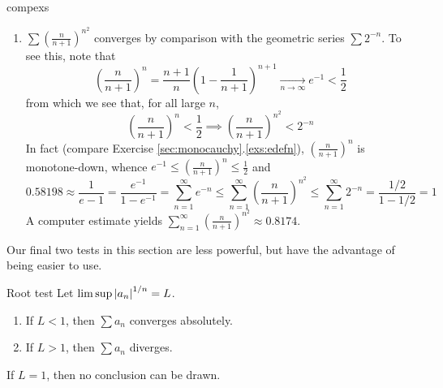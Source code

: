 \begin{examples}{}{compexs}
\begin{enumerate}
	  
	
	
	
	
		\item\label{ex:root5} $\sum\left(\frac n{n+1}\right)^{n^2}$ converges by comparison with the geometric series $\sum 2^{-n}$. To see this, note that
		\[\left(\frac n{n+1}\right)^n=\frac{n+1}n\left(1-\frac 1{n+1}\right)^{n+1}\xrightarrow[n\to\infty]{}e^{-1}<\frac 12\]
		from which we see that, for all large $n$,
		\[\left(\frac n{n+1}\right)^n<\frac 12\implies \left(\frac n{n+1}\right)^{n^2}< 2^{-n}\]
		In fact (compare Exercise \ref*{sec:monocauchy}.\ref{exs:edefn}), $\left(\frac n{n+1}\right)^n$ is monotone-down, whence $e^{-1}\le \left(\frac n{n+1}\right)^n\le \frac 12$ and
		\[0.58198\approx\frac 1{e-1}=\frac{e^{-1}}{1-e^{-1}}=\sum_{n=1}^\infty e^{-n}\le \sum_{n=1}^\infty\left(\frac n{n+1}\right)^{n^2}\le \sum_{n=1}^\infty 2^{-n}=\frac{1/2}{1-1/2}=1\]
		A computer estimate yields $\sum\limits_{n=1}^\infty\left(\frac n{n+1}\right)^{n^2}\approx 0.8174$.
	\end{enumerate}
\end{examples}



\goodbreak

Our final two tests in this section are less powerful, but have the advantage of being easier to use. %


\begin{thm}{Root test}{}
Let $\limsup\left| a_n\right|^{1/n}=L$.
\begin{enumerate}
	\item If $L<1$, then $\sum a_n$ converges absolutely.
	\item If $L>1$, then $\sum a_n$ diverges.
\end{enumerate}
If $L=1$, then no conclusion can be drawn.
\end{thm}

